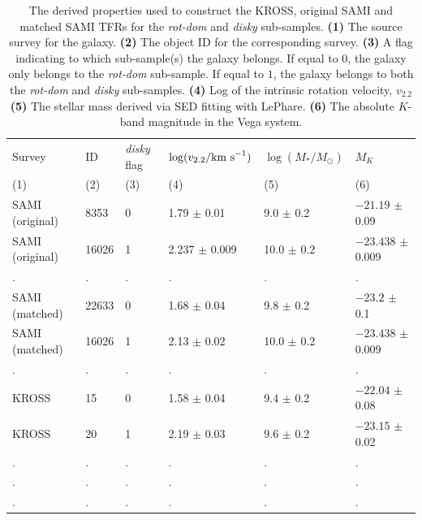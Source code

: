 \documentclass[a4paper,fleqn,usenatbib]{mnras}
\begin{document}
{\begin{table}
\centering
\begin{tabular}{ llllll}
\hline
Survey & ID  & \textit{disky} flag & $\log(v_{2.2}/\rm{km\ s}^{-1})$ & $\log(M_{*}/M_{\odot})$ & $M_{K}$ \\
(1) & (2)  & (3) & (4) & (5) & (6) \\
\hline
SAMI (original) & 8353  & 0 & 1.79 $\pm$ 0.01 & \phantom{0}9.0 $\pm$ 0.2 & $-21.19$\phantom{0} $\pm$ 0.09 \\
SAMI (original) & 16026  & 1 & 2.237 $\pm$ 0.009 & 10.0 $\pm$ 0.2 & $-23.438$ $\pm$ 0.009 \\
. & .  & . & . &  \phantom{0}. & . \\
SAMI (matched) & 22633  & 0 & 1.68\phantom{0} $\pm$ 0.04\phantom{0} &  \phantom{0}9.8 $\pm$ 0.2 & $-23.2$\phantom{00} $\pm$ 0.1\phantom{0} \\
SAMI (matched) & 16026  & 1 & 2.13\phantom{0} $\pm$ 0.02\phantom{0} & 10.0 $\pm$ 0.2 & $-23.438$ $\pm$ 0.009 \\
. & .  & . & . &  \phantom{0}. & . \\
KROSS & 15  & 0 & 1.58 $\pm$ 0.04\phantom{0} &  \phantom{0}9.4 $\pm$ 0.2 & $-22.04$ $\pm$ 0.08 \\
KROSS & 20  & 1 & 2.19 $\pm$ 0.03 &  \phantom{0}9.6 $\pm$ 0.2 & $-23.15$ $\pm$ 0.02 \\
. & .  & . & . & \phantom{0}. & . \\
. & .  & . & . &  \phantom{0}. & . \\
. & .  & . & . &  \phantom{0}. & . \\
\hline
\end{tabular}

\caption{The derived properties used to construct the KROSS, original SAMI and matched SAMI TFRs for the \textit{rot-dom} and \textit{disky} sub-samples. {\bf (1)} The source survey for the galaxy.  {\bf (2)} The object ID for the corresponding survey.  {\bf (3)} A flag indicating to which sub-sample(s) the galaxy belongs. If equal to $0$, the galaxy only belongs to the \textit{rot-dom} sub-sample. If equal to $1$, the galaxy belongs to both the \textit{rot-dom} and \textit{disky} sub-samples. {\bf (4)} Log of the intrinsic rotation velocity, $v_{2.2}$ {\bf (5)} The stellar mass derived via SED fitting with {\sc LePhare}. {\bf (6)} The absolute $K$-band magnitude in the Vega system.}
\label{tab:tfrvals}
\end{table}

}
\end{document}
